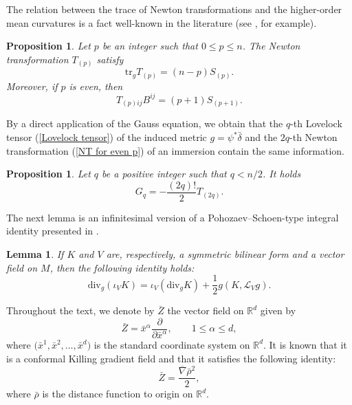 \documentclass[pdftex]{sigma}
\numberwithin{equation}{section}
\newtheorem{Lemma}[Theorem]{Lemma}
\newtheorem{Proposition}[Theorem]{Proposition}
\begin{document}
The relation between the trace of Newton transformations and the higher-order
mean curvatures is a fact well-known in the literature (see
\cite[Lemma 2.2]{GrosjeanUpperboundsfirst2002}, for example).
\begin{Proposition} %
  Let $p$ be an integer such that $0 \leq p \leq n$. The Newton transformation $T_{(p)}$ satisfy
  \begin{equation} \label{trace T}
    \mathrm{tr}_gT_{(p)} = (n-p)S_{(p)}.
  \end{equation}
 Moreover, if $p$ is even, then
 \begin{equation*} %
   T_{(p)ij}B^{ij} = (p+1)S_{(p+1)}.
 \end{equation*}
\end{Proposition}

By a direct application of the Gauss equation, we obtain that the \(q\)-th
Lovelock tensor (\ref{Lovelock tensor}) of the induced metric
\(g = \psi^\ast \bar{\delta}\) and the \(2q\)-th Newton transformation
(\ref{NT for even p}) of an immersion contain the same information.
\begin{Proposition} %
  Let $q$ be a positive integer such that $q < n/2$. It holds
  \begin{equation} \label{equation relation G and T}
    G_{q} = - \frac{(2q)!}{2}T_{(2q)}.
  \end{equation}
\end{Proposition}

The next lemma is an infinitesimal version of a Pohozaev--Schoen-type integral
identity presented in \cite[Propositon 3.2]{deLimamasstermsEinstein2019}.
\begin{Lemma} %
  If $K$ and $V$ are, respectively, a symmetric bilinear form and a vector field on $M$, then the following identity holds:
  \begin{equation} \label{equation div V interno K}
    \mathrm{div}_g (\iota_VK) = \iota_V(\mathrm{div}_gK) + \frac{1}{2}g(K, \mathcal{L}_Vg).
  \end{equation}
\end{Lemma}

Throughout the text, we denote by \(\bar{Z}\) the vector field on
$\mathbb{R}^d$ given by
\begin{equation*}
 \bar{Z} = \bar{x}^{\alpha} \frac{\partial}{\partial \bar{x}^{\alpha}},
 \qquad 1 \le \alpha \le d,
\end{equation*}
where \(\bigl( \bar{x}^1, \bar{x}^2, \ldots, \bar{x}^d \bigr)\)
is the standard coordinate system on \(\mathbb{R}^d\). It is known that
it is a conformal Killing gradient field and that it satisfies the following identity:
\begin{equation*}
 \bar{Z} = \frac{\overline{\nabla}\bar{\rho}^2}{2},
\end{equation*}
where \(\bar{\rho}\) is the distance function to origin on \(\mathbb{R}^d\).
\end{document}
